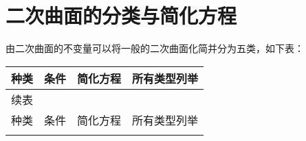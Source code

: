 \section{二次曲面的分类与简化方程}
由二次曲面的不变量可以将一般的二次曲面化简并分为五类，如下表：
\begin{center}
	\renewcommand\arraystretch{1.5}
	\begin{longtable}{|c|c|c|c|c|}%
		\hline
		种类 & 条件 & 简化方程 & \multicolumn{2}{c|}{所有类型列举} \\
		
		\hline
		\endfirsthead
		
		\multicolumn{5}{l}{续表}  \\
		\hline
		种类 & 条件 & 简化方程 & \multicolumn{2}{c|}{所有类型列举 } \\
		
		\hline
		\endhead
		
		\hline
		\endfoot
		

\end{longtable}
\end{center}
